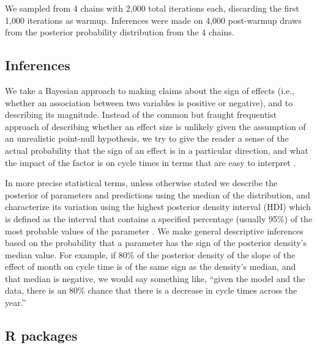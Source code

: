 \documentclass[
  sn-mathphys-ay,
]{sn-jnl}
\begin{document}
We sampled from 4 chains with 2,000 total iterations each, discarding
the first 1,000 iterations as warmup. Inferences were made on 4,000
post-warmup draws from the posterior probability distribution from the 4
chains.

\subsection{Inferences}\label{inferences}

We take a Bayesian approach to making claims about the sign of effects
(i.e., whether an association between two variables is positive or
negative), and to describing its magnitude. Instead of the common but
fraught frequentist approach of describing whether an effect size is
unlikely given the assumption of an unrealistic point-null hypothesis,
we try to give the reader a sense of the actual probability that the
sign of an effect is in a particular direction, and what the impact of
the factor is on cycle times in terms that are easy to interpret
\citep{GelmanPowerCalculationsAssessing2014}.

In more precise statistical terms, unless otherwise stated we describe
the posterior of parameters and predictions using the median of the
distribution, and characterize its variation using the highest posterior
density interval (HDI) which is defined as the interval that contains a
specified percentage (usually 95\%) of the most probable values of the
parameter \citep{kruschkeRejectingAcceptingParameter2018}. We make
general descriptive inferences based on the probability that a parameter
has the sign of the posterior density's median value. For example, if
80\% of the posterior density of the slope of the effect of month on
cycle time is of the same sign as the density's median, and that median
is negative, we would say something like, ``given the model and the
data, there is an 80\% chance that there is a decrease in cycle times
across the year.''

\subsection{R packages}\label{r-packages}
\end{document}
